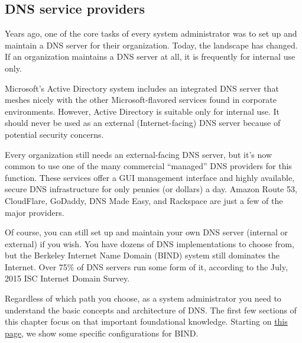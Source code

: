 \protect\hypertarget{part0024_split_003.html}{}{}

\hypertarget{part0024_split_003.htmlux5cux23_idContainer1069}{}
\hypertarget{part0024_split_003.htmlux5cux23calibre_pb_2}{%
\subsection[DNS service
providers]{\texorpdfstring{\protect\hypertarget{part0024_split_003.htmlux5cux23_idTextAnchor844}{}{}DNS
service
providers}{DNS service providers}}\label{part0024_split_003.htmlux5cux23calibre_pb_2}}

\protect\hypertarget{part0024_split_003.htmlux5cux23_idIndexMarker1972}{}{}\protect\hypertarget{part0024_split_003.htmlux5cux23_idIndexMarker1973}{}{}Years
ago, one of the core tasks of every system administrator was to set up
and maintain a DNS server for their organization. Today, the landscape
has changed. If an organization maintains a DNS server at all, it is
frequently for internal use only.

Microsoft's Active Directory system includes an integrated DNS server
that meshes nicely with the other Microsoft-flavored services found in
corporate environments. However, Active Directory is suitable only for
internal use. It should never be used as an external (Internet-facing)
DNS server because of potential security concerns.

\protect\hypertarget{part0024_split_003.htmlux5cux23_idTextAnchor845}{}{}Every
organization still needs an external-facing DNS server, but it's now
common to use one of the many commercial ``managed'' DNS providers for
this function. These services offer a GUI management interface and
highly available, secure DNS infrastructure for only pennies (or
dollars) a day. Amazon Route 53, CloudFlare, GoDaddy, DNS Made Easy, and
Rackspace are just a few of the major providers.

Of course, you can still set up and maintain your own DNS server
(internal or external) if you wish. You have dozens of DNS
implementations to choose from, but the Berkeley Internet Name Domain
(BIND) system still dominates the Internet.
\protect\hypertarget{part0024_split_003.htmlux5cux23_idIndexMarker1974}{}{}Over
75\% of DNS servers run some form of it, according to the July, 2015 ISC
Internet Domain Survey.

Regardless of which path you choose, as a system administrator you need
to understand the basic concepts and architecture of DNS. The first few
sections of this chapter focus on that important foundational knowledge.
Starting on
\protect\hyperlink{part0024_split_047.htmlux5cux23_idTextAnchor922}{this
page}, we show some specific configurations for BIND.


